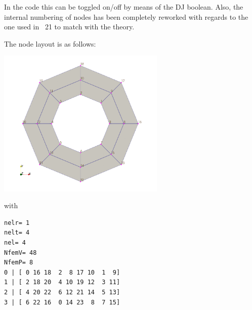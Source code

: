 In the code this can be toggled on/off by means of the {\python DJ} boolean.
Also, the internal numbering of nodes has been completely reworked with regards to 
the one used in \stone~21 to match with the theory.

The node layout is as follows:

\begin{center}
\includegraphics[width=8cm]{python_codes/fieldstone_133/images/nodes}
\end{center}
with
\begin{verbatim}
nelr= 1
nelt= 4
nel= 4
NfemV= 48
NfemP= 8
0 | [ 0 16 18  2  8 17 10  1  9]
1 | [ 2 18 20  4 10 19 12  3 11]
2 | [ 4 20 22  6 12 21 14  5 13]
3 | [ 6 22 16  0 14 23  8  7 15]
\end{verbatim}








